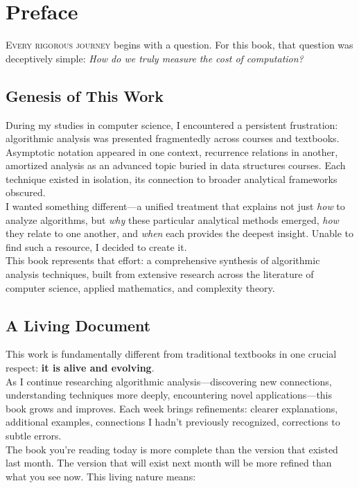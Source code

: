 \chapter*{Preface}

\lettrine{E}{very rigorous journey} begins with a question. For this book, that question was deceptively simple: \textit{How do we truly measure the cost of computation?}

\section*{Genesis of This Work}

During my studies in computer science, I encountered a persistent frustration: algorithmic analysis was presented fragmentedly across courses and textbooks. Asymptotic notation appeared in one context, recurrence relations in another, amortized analysis as an advanced topic buried in data structures courses. Each technique existed in isolation, its connection to broader analytical frameworks obscured.\\
I wanted something different—a unified treatment that explains not just \textit{how} to analyze algorithms, but \textit{why} these particular analytical methods emerged, \textit{how} they relate to one another, and \textit{when} each provides the deepest insight. Unable to find such a resource, I decided to create it.\\
This book represents that effort: a comprehensive synthesis of algorithmic analysis techniques, built from extensive research across the literature of computer science, applied mathematics, and complexity theory.

\section*{A Living Document}

This work is fundamentally different from traditional textbooks in one crucial respect: \textbf{it is alive and evolving}.\\
As I continue researching algorithmic analysis—discovering new connections, understanding techniques more deeply, encountering novel applications—this book grows and improves. Each week brings refinements: clearer explanations, additional examples, connections I hadn't previously recognized, corrections to subtle errors.\\
The book you're reading today is more complete than the version that existed last month. The version that will exist next month will be more refined than what you see now. This living nature means:

